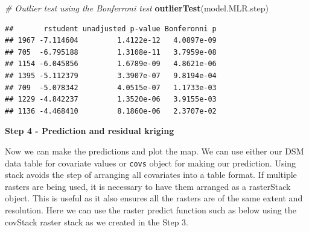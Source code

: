 \documentclass[10pt,b5paper,]{book}
\newenvironment{Shaded}{\begin{snugshade}}{\end{snugshade}}
\newcommand{\CommentTok}[1]{\textcolor[rgb]{0.56,0.35,0.01}{\textit{#1}}}
\newcommand{\DataTypeTok}[1]{\textcolor[rgb]{0.13,0.29,0.53}{#1}}
\newcommand{\KeywordTok}[1]{\textcolor[rgb]{0.13,0.29,0.53}{\textbf{#1}}}
\newcommand{\NormalTok}[1]{#1}
\newcommand{\OperatorTok}[1]{\textcolor[rgb]{0.81,0.36,0.00}{\textbf{#1}}}
\newcommand{\StringTok}[1]{\textcolor[rgb]{0.31,0.60,0.02}{#1}}
\theoremstyle{definition}
\theoremstyle{definition}
\theoremstyle{definition}
\theoremstyle{remark}
\begin{document}
\begin{Shaded}
\begin{Highlighting}[]
\CommentTok{# Outlier test using the Bonferroni test}
\KeywordTok{outlierTest}\NormalTok{(model.MLR.step)}
\end{Highlighting}
\end{Shaded}

\begin{verbatim}
##       rstudent unadjusted p-value Bonferonni p
## 1967 -7.114604         1.4122e-12   4.0897e-09
## 705  -6.795188         1.3108e-11   3.7959e-08
## 1154 -6.045856         1.6789e-09   4.8621e-06
## 1395 -5.112379         3.3907e-07   9.8194e-04
## 709  -5.078342         4.0515e-07   1.1733e-03
## 1229 -4.842237         1.3520e-06   3.9155e-03
## 1136 -4.468410         8.1860e-06   2.3707e-02
\end{verbatim}

\textbf{Step 4 - Prediction and residual kriging}

Now we can make the predictions and plot the map. We can use either our
DSM data table for covariate values or \texttt{covs} object for making
our prediction. Using stack avoids the step of arranging all covariates
into a table format. If multiple rasters are being used, it is necessary
to have them arranged as a rasterStack object. This is useful as it also
ensures all the rasters are of the same extent and resolution. Here we
can use the raster predict function such as below using the covStack
raster stack as we created in the Step 3.

\begin{Shaded}
\end{Shaded}
\end{document}
